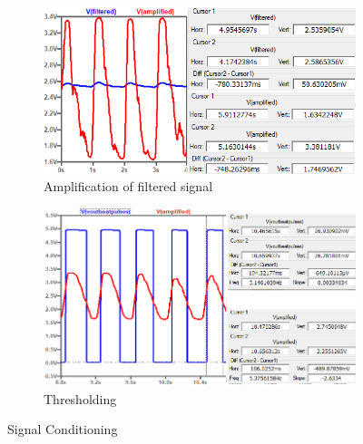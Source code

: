 \begin{figure}[h]
 \footnotesize
   \centering
   \begin{subfigure}[]{0.49\textwidth}
        \includegraphics[width=\linewidth]{./Figures/amplified}
	  \caption{Amplification of filtered signal} \label{subfig:amplified}	
   \end{subfigure}
   \begin{subfigure}[]{0.49\textwidth}
  	 \includegraphics[width=\linewidth]{./Figures/pulses}
	  \caption{Thresholding} \label{subfig:pulses}	
   \end{subfigure}
   \caption{Signal Conditioning}
 \end{figure}

